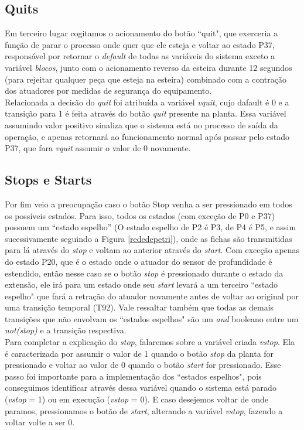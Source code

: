 \documentclass[a4paper,twoside]{articlewithlogo}
\begin{document}
\subsection*{Quits}Em terceiro lugar cogitamos o acionamento do botão ``quit", que exerceria a função de parar o processo onde quer que ele esteja e voltar ao estado P37, responsável por retornar o \textit{default} de todas as variáveis do sistema exceto a variável \textit{blocos}, junto com o acionamento reverso da esteira durante 12 segundos (para rejeitar qualquer peça que esteja na esteira) combinado com a contração dos atuadores por medidas de segurança do equipamento.
\\
Relacionada a decisão do \textit{quit} foi atribuída a variável \textit{vquit}, cujo dafault é 0 e a transição para 1 é feita através do botão \textit{quit} presente na planta. Essa variável assumindo valor positivo sinaliza que o sistema está no processo de saída da operação, e apenas retornará ao funcionamento normal após passar pelo estado P37, que fara \textit{vquit} assumir o valor de 0 novamente.

\subsection*{Stops e Starts}Por fim veio a preocupação caso o botão Stop venha a ser pressionado em todos os possíveis estados. Para isso, todos os estados (com exceção de P0 e P37) possuem um ``estado espelho'' (O estado espelho de P2 é P3, de P4 é P5, e assim sucessivamente seguindo a Figura \ref{rededepetri}), onde as fichas são transmitidas para lá através do \textit{stop} e voltam ao anterior através do \textit{start}. Com exceção apenas do estado P20, que é o estado onde o atuador do sensor de profundidade é estendido, então nesse caso se o botão \textit{stop} é pressionado durante o estado da extensão, ele irá para um estado onde seu \textit{start} levará a um terceiro ``estado espelho" que fará a retração do atuador novamente antes de voltar ao original por uma transição temporal (T92). Vale ressaltar também que todas as demais transições que não envolvam os ``estados espelhos" são um \textit{and} booleano entre um \textit{not(stop)} e a transição respectiva.
\\
Para completar a explicação do \textit{stop}, falaremos sobre a variável criada \textit{vstop}. Ela é caracterizada por assumir o valor de 1 quando o botão \textit{stop} da planta for pressionado e voltar ao valor de 0 quando o botão \textit{start} for pressionado. Esse passo foi importante para a implementação dos ``estados espelhos", pois conseguimos identificar através dessa variável quando o sistema está parado (\textit{vstop} = 1) ou em execução (\textit{vstop} = 0). E caso desejemos voltar de onde paramos, pressionamos o botão de \textit{start}, alterando a variável \textit{vstop}, fazendo a voltar volte a ser 0.
\end{document}
